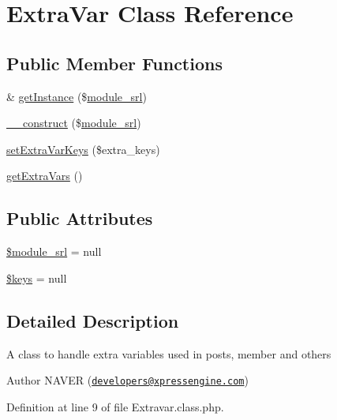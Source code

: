 \hypertarget{classExtraVar}{\section{Extra\-Var Class Reference}
\label{classExtraVar}
}
\subsection*{Public Member Functions}
\begin{DoxyCompactItemize}
\item 
\& \hyperlink{classExtraVar_ad65adf9c2fc8c077dd2764b4faf2d8c4}{get\-Instance} (\$\hyperlink{ko_8install_8php_a370bb6450fab1da3e0ed9f484a38b761}{module\-\_\-srl})
\item 
\hyperlink{classExtraVar_a114ede550588bd337e8d4a7e033cf1b2}{\-\_\-\-\_\-construct} (\$\hyperlink{ko_8install_8php_a370bb6450fab1da3e0ed9f484a38b761}{module\-\_\-srl})
\item 
\hyperlink{classExtraVar_a8e5bb2ebfd6da9d82e78596b5e760e58}{set\-Extra\-Var\-Keys} (\$extra\-\_\-keys)
\item 
\hyperlink{classExtraVar_abe624f7d58678487a37176fe1175a060}{get\-Extra\-Vars} ()
\end{DoxyCompactItemize}
\subsection*{Public Attributes}
\begin{DoxyCompactItemize}
\item 
\hyperlink{classExtraVar_a3a84e48f2cdf01660b2844244f8fd9f7}{\$module\-\_\-srl} = null
\item 
\hyperlink{classExtraVar_ac2aee2ca8a3299c952ba8f155eaadc64}{\$keys} = null
\end{DoxyCompactItemize}


\subsection{Detailed Description}
A class to handle extra variables used in posts, member and others

\begin{DoxyAuthor}{Author}
N\-A\-V\-E\-R (\href{mailto:developers@xpressengine.com}{\tt developers@xpressengine.\-com}) 
\end{DoxyAuthor}


Definition at line 9 of file Extravar.\-class.\-php.



